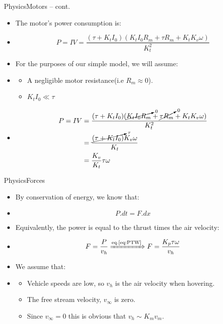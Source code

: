 \documentclass[8pt]{beamer}
\newcommand{\Ytri}{$\triangleright$ }
\renewcommand{\|}[1][.3em]{\hspace{#1}|\hspace{#1}}
\renewcommand{\,}[1][.3em]{,\hspace{#1}}
\newcommand{\subitem}{\item[\Ytri]}
\begin{document}
\begin{frame}{Physics}{Motors -- cont.}
    \begin{itemize}
    \item The motor's power consumption is:
    \item[] \begin{equation}
    P = IV = \frac{(\tau + K_tI_0)(K_tI_0R_m + {\tau}R_m + K_tK_v\omega)}{K_t^2}
    \end{equation}
    \pause
    \item For the purposes of our simple model, we will assume:
    \item[] \begin{itemize}
        \subitem A negligible motor resistance(i.e $R_m \approx 0$).
        \subitem $K_tI_0 \ll \tau$
    \end{itemize}
    \item[] \vspace{-2.5em}\begin{align}
    P = IV  &= \frac{(\tau + K_tI_0)(\cancelto{0}{K_tI_0R_m} + \cancelto{0}{{\tau}R_m} + K_tK_v\omega)}{K_t^2}\nonumber\\
            &= \frac{\cancelto{\tau}{(\tau + K_tI_0)}K_v\omega}{K_t}\nonumber\\
            &= {K_v \over K_t}\tau\omega\label{eq:PTW}
    \end{align}
    \end{itemize}
\end{frame}


\begin{frame}{Physics}{Forces}
    \begin{itemize}
    \item  By conservation of energy, we know that:
    \item[]\hspace{1em}\begin{equation}
    P.dt = F.dx
    \end{equation}
    \pause
    \item Equivalently, the power is equal to the thrust times the air velocity:
    \item[] \begin{equation}
    F = {P \over v_h} \xRightarrow{\text{eq.\ref{eq:PTW}}} F = { K_p\tau\omega \over v_h}
    \label{eq:motors_force}
    \end{equation}
    \pause
    \item We assume that:
    \item[] \begin{itemize}
        \subitem Vehicle speeds are low, so $v_h$ is the air velocity when hovering.
        \subitem The free stream velocity, $v_{\infty}$ is zero.
        \subitem Since $v_{\infty} = 0$ this is obvious that $v_h \sim  K_mv_m$.
    \end{itemize}
    \end{itemize}
\end{frame}
\end{document}
